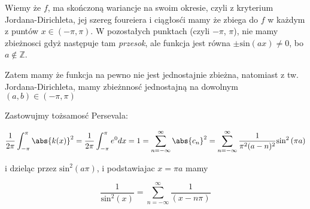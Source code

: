 \documentclass[11pt]{scrartcl}
\begin{document}
Wiemy że $f$, ma skończoną wariancje na swoim okresie, czyli z kryterium Jordana-Dirichleta, jej szereg foureiera i ciągłosći mamy że zbiega do $f$ w każdym z puntów $x \in (-\pi , \pi )$. W pozostałych punktach (czyli $-\pi $, $\pi $), nie mamy zbieżnosci gdyż następuje tam \textit{przesok}, ale funkcja jest równa $\pm \text{sin} \left ( ax \right ) \not = 0 $, bo $a \not \in \mathbb{Z} $.

Zatem mamy że funkcja na pewno nie jest jednostajnie zbieżna, natomiast z tw. Jordana-Dirichleta, mamy zbieżnnosć jednostajną na dowolnym $(a,b) \in (-\pi , \pi )$

Zastowujmy tożsamosć Persevala:

\[
  \frac{1}{2 \pi } \int_{- \pi }^{\pi } \abs{k(x)}^2 = \frac{1}{2 \pi } \int_{-\pi }^\pi e^0 dx = 1 = \sum_{n = - \infty }^{\infty } \abs{c_n}^2 = \sum_{n = -\infty }^{\infty } \frac{1}{\pi^2 (a-n)^2} \text{sin}^2 \left ( \pi a \right )       
\]

i dzieląc przez $\text{sin}^2 \left ( a \pi  \right ) $, i podstawiajac $x = \pi a$ mamy

\[
    \frac{1}{\text{sin}^2 \left ( x \right ) } = \sum_{n = -\infty }^{\infty } \frac{1}{(x- n \pi )}  
\]
\end{document}
